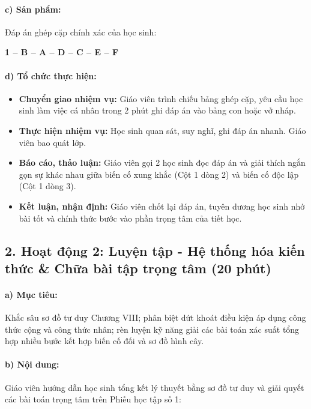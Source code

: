 \documentclass[12pt, a4paper]{article}
\begin{document}
\paragraph{c) Sản phẩm:} Đáp án ghép cặp chính xác của học sinh:
\begin{center}
\textbf{1 -- B \quad \textbar {} -- A \quad \textbar {} -- D \quad \textbar {} -- C \quad \textbar {} -- E \quad \textbar {} -- F}
\end{center}

\paragraph{d) Tổ chức thực hiện:}
\begin{itemize}[leftmargin=0.8cm]
    \item \textbf{Chuyển giao nhiệm vụ:} Giáo viên trình chiếu bảng ghép cặp, yêu cầu học sinh làm việc cá nhân trong 2 phút ghi đáp án vào bảng con hoặc vở nháp.
    \item \textbf{Thực hiện nhiệm vụ:} Học sinh quan sát, suy nghĩ, ghi đáp án nhanh. Giáo viên bao quát lớp.
    \item \textbf{Báo cáo, thảo luận:} Giáo viên gọi 2 học sinh đọc đáp án và giải thích ngắn gọn sự khác nhau giữa biến cố xung khắc (Cột 1 dòng 2) và biến cố độc lập (Cột 1 dòng 3).
    \item \textbf{Kết luận, nhận định:} Giáo viên chốt lại đáp án, tuyên dương học sinh nhớ bài tốt và chính thức bước vào phần trọng tâm của tiết học.
\end{itemize}

\subsection*{2. Hoạt động 2: Luyện tập - Hệ thống hóa kiến thức \& Chữa bài tập trọng tâm (20 phút)}

\paragraph{a) Mục tiêu:} Khắc sâu sơ đồ tư duy Chương VIII; phân biệt dứt khoát điều kiện áp dụng công thức cộng và công thức nhân; rèn luyện kỹ năng giải các bài toán xác suất tổng hợp nhiều bước kết hợp biến cố đối và sơ đồ hình cây.

\paragraph{b) Nội dung:} Giáo viên hướng dẫn học sinh tổng kết lý thuyết bằng sơ đồ tư duy và giải quyết các bài toán trọng tâm trên Phiếu học tập số 1:
\end{document}
